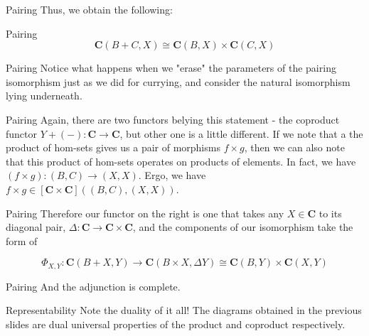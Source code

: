 \documentclass[tikz]{beamer}
\theoremstyle{definition}
\newcommand{\cat}[1]{\mathbf{#1}}
\begin{document}
\begin{frame}{Pairing}
Thus, we obtain the following:

\begin{block}{Pairing}
    \begin{equation*}
        \mathbf{C}(B + C, X) \cong \mathbf{C}(B, X) \times \mathbf{C}(C, X)
    \end{equation*}{}
\end{block}{}
\end{frame}

\begin{frame}{Pairing}
    Notice what happens when we "erase" the parameters of the pairing isomorphism just as we did for currying, and consider the natural isomorphism lying underneath.
\end{frame}

\begin{frame}{Pairing}
    Again, there are two functors belying this statement - the coproduct functor $Y + (-): \cat{C} \to \cat{C}$, but other one is a little different. If we note that a the product of hom-sets gives us a pair of morphisms $f \times g$, then we can also note that this product of hom-sets operates on products of elements. In fact, we have $(f \times g): (B, C) \to (X,X)$. Ergo, we have $f \times g \in \cat{[C \times C]}((B,C), (X,X))$.
\end{frame}

\begin{frame}{Pairing}
    Therefore our functor on the right is one that takes any $X \in \cat{C}$ to its diagonal pair, $\Delta: \cat{C} \to \cat{C} \times \cat{C}$, and the components of our isomorphism take the form of

    \begin{center}
        \begin{equation*}
		\Phi_{X,Y} : \cat{C}(B + X, Y) \to \cat{C}(B \times X, \Delta Y) \cong \cat{C}(B, Y) \times \cat{C}(X, Y)
	\end{equation*}
    \end{center}
\end{frame}

\begin{frame}{Pairing}
    And the adjunction is complete.
\end{frame}

\begin{frame}{Representability}
    Note the duality of it all! The diagrams obtained in the previous slides are dual universal properties of the product and coproduct respectively.
\end{frame}
\end{document}

